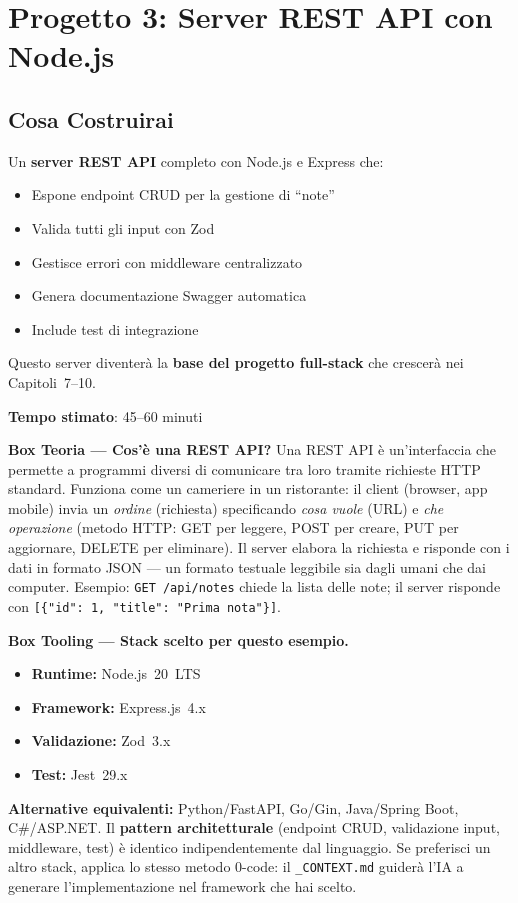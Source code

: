\chapter{Progetto 3: Server REST API con Node.js}

\section*{Cosa Costruirai}
Un \textbf{server REST API} completo con Node.js e Express che:
\begin{itemize}
  \item Espone endpoint CRUD per la gestione di ``note''
  \item Valida tutti gli input con Zod
  \item Gestisce errori con middleware centralizzato
  \item Genera documentazione Swagger automatica
  \item Include test di integrazione
\end{itemize}

Questo server diventerà la \textbf{base del progetto full-stack} che crescerà nei Capitoli~7--10.

\textbf{Tempo stimato}: 45--60 minuti

\begin{notebox}
\textbf{Box Teoria --- Cos'è una REST API?} Una REST API è un'interfaccia che permette a programmi diversi di comunicare tra loro tramite richieste HTTP standard. Funziona come un cameriere in un ristorante: il client (browser, app mobile) invia un \textit{ordine} (richiesta) specificando \textit{cosa vuole} (URL) e \textit{che operazione} (metodo HTTP: GET per leggere, POST per creare, PUT per aggiornare, DELETE per eliminare). Il server elabora la richiesta e risponde con i dati in formato JSON --- un formato testuale leggibile sia dagli umani che dai computer. Esempio: \texttt{GET /api/notes} chiede la lista delle note; il server risponde con \texttt{[\{"id": 1, "title": "Prima nota"\}]}.
\end{notebox}

\begin{notebox}
\textbf{Box Tooling --- Stack scelto per questo esempio.}
\begin{itemize}
  \item \textbf{Runtime:} Node.js~20~LTS
  \item \textbf{Framework:} Express.js~4.x
  \item \textbf{Validazione:} Zod~3.x
  \item \textbf{Test:} Jest~29.x
\end{itemize}
\textbf{Alternative equivalenti:} Python/FastAPI, Go/Gin, Java/Spring Boot, C\#/ASP.NET. Il \textbf{pattern architetturale} (endpoint CRUD, validazione input, middleware, test) è identico indipendentemente dal linguaggio. Se preferisci un altro stack, applica lo stesso metodo 0-code: il \texttt{\_CONTEXT.md} guiderà l'IA a generare l'implementazione nel framework che hai scelto.
\end{notebox}

